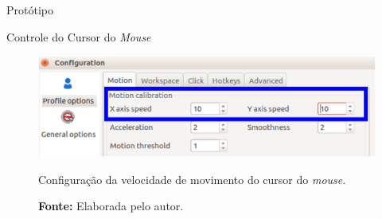 \begin{chapter}{Protótipo}
\begin{section}{Controle do Cursor do \textit{Mouse}}
\begin{figure}[!h]
	\centering
	\begin{minipage}[c]{\textwidth}
	\centering
	\includegraphics[width=0.6\linewidth]{fig/EviacamConfiguration}
	\caption{Configuração da velocidade de movimento do cursor do \textit{mouse}.}
	\vspace{-1cm}
	\caption*{\textbf{Fonte: }Elaborada pelo autor.}
	\label{fig:mouse1}
	\end{minipage}
\end{figure}

\end{section}

\end{chapter}
